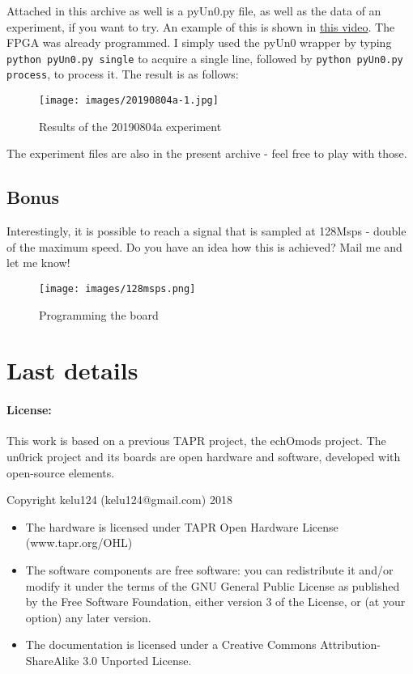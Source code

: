 \documentclass{article}
\begin{document}
Attached in this archive as well is a pyUn0.py file, as well as the data of an experiment, if you want to try. An example of this is shown in \href{https://youtu.be/rv-Ag_TcnP8}{this video}. The FPGA was already programmed. I simply used the pyUn0 wrapper by typing \verb|python pyUn0.py single| to acquire a single line, followed by \verb|python pyUn0.py process|, to process it. The result is as follows:

\begin{figure}[!htbp]
\centering
  \texttt{[image: images/20190804a-1.jpg]}
  \caption{Results of the 20190804a experiment}
  \label{fig:20190804a}
\end{figure}

The experiment files are also in the present archive - feel free to play with those.


\subsection{Bonus}

Interestingly, it is possible to reach a signal that is sampled at 128Msps - double of the maximum speed. Do you have an idea how this is achieved? Mail me and let me know!

\begin{figure}[!htbp]
\centering
  \texttt{[image: images/128msps.png]}
  \caption{Programming the board}
  \label{fig:128msps}
\end{figure}

\newpage \section{Last details}

\paragraph{License:}

This work is based on a previous TAPR project, the echOmods project. The un0rick project and its boards are open hardware and software, developed with open-source elements.

Copyright kelu124 (kelu124@gmail.com) 2018

\begin{itemize}
\item The hardware is licensed under TAPR Open Hardware License (www.tapr.org/OHL)
\item The software components are free software: you can redistribute it and/or modify it under the terms of the GNU General Public License as published by the Free Software Foundation, either version 3 of the License, or (at your option) any later version.
\item The documentation is licensed under a Creative Commons Attribution-ShareAlike 3.0 Unported License.
\end{itemize}
\end{document}
